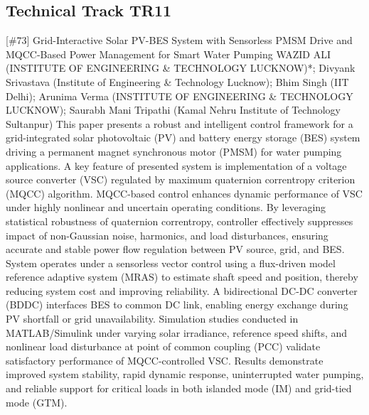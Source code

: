 \clearpage \subsection{Technical Track TR11}\nopagebreak {} \begin{abstract_online} {[\#73] Grid-Interactive Solar PV-BES System with Sensorless PMSM Drive and MQCC-Based Power Management for Smart Water Pumping} {} {WAZID  ALI (INSTITUTE OF ENGINEERING \& TECHNOLOGY LUCKNOW)*; Divyank  Srivastava (Institute of Engineering \& Technology Lucknow); Bhim  Singh (IIT Delhi); Arunima  Verma (INSTITUTE OF ENGINEERING \& TECHNOLOGY LUCKNOW); Saurabh Mani Tripathi (Kamal Nehru Institute of Technology Sultanpur)} {} This paper presents a robust and intelligent control framework for a grid-integrated solar photovoltaic (PV) and battery energy storage (BES) system driving a permanent magnet synchronous motor (PMSM) for water pumping applications. A key feature of presented system is implementation of a voltage source converter (VSC) regulated by maximum quaternion correntropy criterion (MQCC) algorithm. MQCC-based control enhances dynamic performance of VSC under highly nonlinear and uncertain operating conditions. By leveraging statistical robustness of quaternion correntropy, controller effectively suppresses  impact of non-Gaussian noise, harmonics, and load disturbances, ensuring accurate and stable power flow regulation between PV source, grid, and BES. System operates under a sensorless vector control using a flux-driven model reference adaptive system (MRAS) to estimate shaft speed and position, thereby reducing system cost and improving reliability. A bidirectional DC-DC converter (BDDC) interfaces BES to common DC link, enabling energy exchange during PV shortfall or grid unavailability. Simulation studies conducted in MATLAB/Simulink under varying solar irradiance, reference speed shifts, and nonlinear load disturbance at  point of common coupling (PCC) validate satisfactory performance of MQCC-controlled VSC. Results demonstrate improved system stability, rapid dynamic response, uninterrupted water pumping, and reliable support for critical loads in both islanded mode (IM) and grid-tied mode (GTM). \end{abstract_online} 
